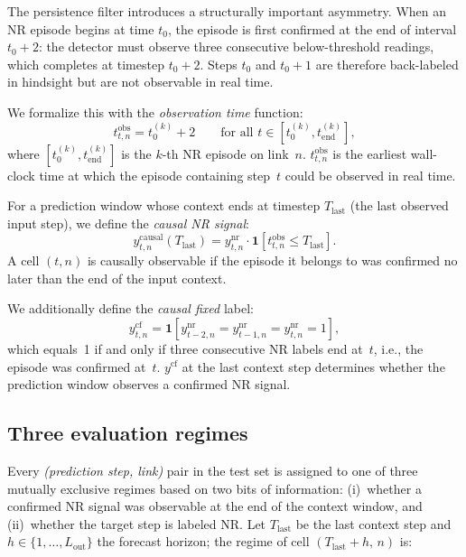 \documentclass[a4paper]{cas-sc}
\newcommand{\causalfixed}{y^{\mathrm{cf}}}
\newcommand{\fullnr}{y^{\mathrm{nr}}}
\newcommand{\obstime}{t^{\mathrm{obs}}}
\begin{document}
The persistence filter introduces a structurally important asymmetry.
When an NR episode begins at time $t_0$, the episode is first
confirmed at the end of interval $t_0 + 2$: the detector must observe
three consecutive below-threshold readings, which completes at
timestep $t_0 + 2$.
Steps $t_0$ and $t_0 + 1$ are therefore back-labeled in hindsight
but are not observable in real time.

We formalize this with the \emph{observation time} function:
\begin{equation}
  \obstime_{t,n} = t_0^{(k)} + 2
  \qquad
  \text{for all } t \in [t_0^{(k)}, t_{\mathrm{end}}^{(k)}],
  \label{eq:obstime}
\end{equation}
where $[t_0^{(k)}, t_{\mathrm{end}}^{(k)}]$ is the $k$-th NR episode on link~$n$.
$\obstime_{t,n}$ is the earliest wall-clock time at which the episode
containing step~$t$ could be observed in real time.

For a prediction window whose context ends at timestep $T_{\mathrm{last}}$
(the last observed input step), we define the \emph{causal NR signal}:
\begin{equation}
  y^{\mathrm{causal}}_{t,n}(T_{\mathrm{last}}) = \fullnr_{t,n}
    \cdot \mathbf{1}\!\left[\obstime_{t,n} \leq T_{\mathrm{last}}\right].
  \label{eq:causal}
\end{equation}
A cell $(t,n)$ is causally observable if the episode it belongs to was
confirmed no later than the end of the input context.

We additionally define the \emph{causal fixed} label:
\begin{equation}
  \causalfixed_{t,n} = \mathbf{1}\!\left[
    \fullnr_{t-2,n} = \fullnr_{t-1,n} = \fullnr_{t,n} = 1
  \right],
  \label{eq:causalfixed}
\end{equation}
which equals~1 if and only if three consecutive NR labels end at~$t$,
i.e., the episode was confirmed at~$t$.
$\causalfixed$ at the last context step determines whether the prediction
window observes a confirmed NR signal.

\subsection{Three evaluation regimes}
\label{sec:regimes}

Every \textit{(prediction step, link)} pair in the test set is
assigned to one of three mutually exclusive regimes based on two bits
of information: (i)~whether a confirmed NR signal was observable at
the end of the context window, and (ii)~whether the target step is
labeled NR.
Let $T_{\mathrm{last}}$ be the last context step and $h \in \{1,\dots,L_{\mathrm{out}}\}$
the forecast horizon; the regime of cell $(T_{\mathrm{last}} + h,\, n)$ is:
\end{document}
